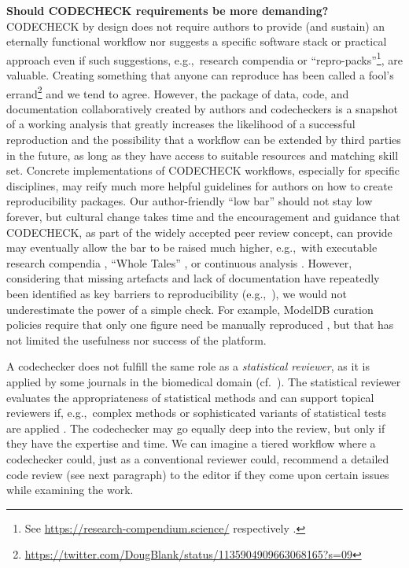 \documentclass[12pt]{article}
\begin{document}
\textbf{Should CODECHECK requirements be more demanding?} \\
CODECHECK by design does not require authors to provide (and sustain)
an eternally functional workflow nor suggests a specific software
stack or practical approach even if such suggestions, e.g.,~research
compendia or ``repro-packs''\footnote{See
  \url{https://research-compendium.science/} respectively
  \cite{barba_praxis_2018}.}, are valuable.  Creating something
that anyone can reproduce has been called a fool's
errand\footnote{\url{https://twitter.com/DougBlank/status/1135904909663068165?s=09}}
and we tend to agree.  However, the package of data, code, and
documentation collaboratively created by authors and codecheckers is a
snapshot of a working analysis that greatly increases the likelihood
of a successful reproduction and the possibility that a workflow can
be extended by third parties in the future, as long as they have
access to suitable resources and matching skill set.  Concrete
implementations of CODECHECK workflows, especially for specific
disciplines, may reify much more helpful guidelines for authors on how
to create reproducibility packages.  Our author-friendly ``low bar''
should not stay low forever, but cultural change takes time and the
encouragement and guidance that CODECHECK, as part of the widely
accepted peer review concept, can provide may eventually allow the bar
to be raised much higher, e.g.,~with executable research
compendia \cite{nust_opening_2017}, ``Whole Tales''
\cite{brinckman_computing_2018}, or continuous analysis
\cite{beaulieu-jones_reproducibility_2017-1}.  However, considering
that missing artefacts and lack of documentation have repeatedly been
identified as key barriers to reproducibility
(e.g.,~\cite{stagge_assessing_2019,nust_improving_2020}), we would not
underestimate the power of a simple check.  For example, ModelDB
curation policies require that only one figure need be manually reproduced
\cite{mcdougal_reproducibility_2016}, but that has not limited the
usefulness nor success of the platform.

A codechecker does not fulfill the same role as a \emph{statistical
  reviewer}, as it is applied by some journals in the biomedical
domain (cf.~\cite{petrovecki_role_2009,greenwood_how_2015}).  The
statistical reviewer evaluates the appropriateness of statistical
methods \cite{greenwood_how_2015} and can support topical reviewers
if, e.g.,~complex methods or sophisticated variants of statistical
tests are applied \cite{petrovecki_role_2009}.  The codechecker may go
equally deep into the review, but only if they have the expertise and
time. We can imagine a tiered workflow where a codechecker could, just
as a conventional reviewer could, recommend a detailed code review
(see next paragraph) to the editor if they come upon certain issues while
examining the work.
\end{document}
